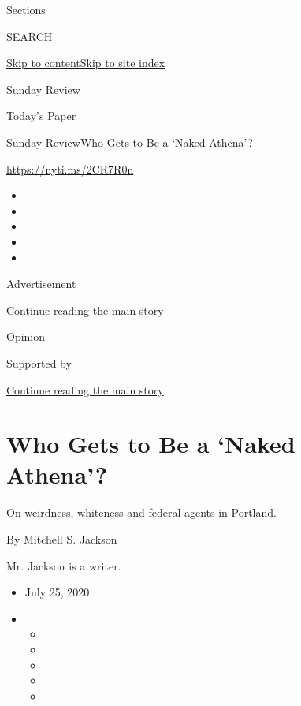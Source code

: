 Sections

SEARCH

\protect\hyperlink{site-content}{Skip to
content}\protect\hyperlink{site-index}{Skip to site index}

\href{https://www.nytimes.com/section/opinion/sunday}{Sunday Review}

\href{https://myaccount.nytimes.com/auth/login?response_type=cookie\&client_id=vi}{}

\href{https://www.nytimes.com/section/todayspaper}{Today's Paper}

\href{/section/opinion/sunday}{Sunday Review}\textbar{}Who Gets to Be a
`Naked Athena'?

\url{https://nyti.ms/2CR7R0n}

\begin{itemize}
\item
\item
\item
\item
\item
\end{itemize}

Advertisement

\protect\hyperlink{after-top}{Continue reading the main story}

\href{/section/opinion}{Opinion}

Supported by

\protect\hyperlink{after-sponsor}{Continue reading the main story}

\hypertarget{who-gets-to-be-a-naked-athena}{%
\section{Who Gets to Be a `Naked
Athena'?}\label{who-gets-to-be-a-naked-athena}}

On weirdness, whiteness and federal agents in Portland.

By Mitchell S. Jackson

Mr. Jackson is a writer.

\begin{itemize}
\item
  July 25, 2020
\item
  \begin{itemize}
  \item
  \item
  \item
  \item
  \item
  \end{itemize}
\end{itemize}

